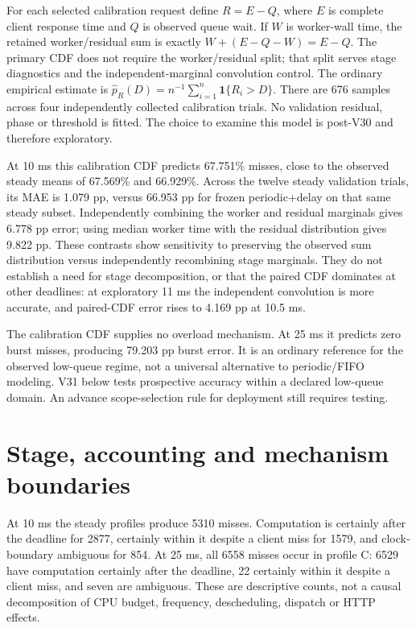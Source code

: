 \documentclass[11pt,a4paper]{article}
\begin{document}
For each selected calibration request define $R=E-Q$, where $E$ is complete
client response time and $Q$ is observed queue wait. If $W$ is worker-wall time,
the retained worker/residual sum is exactly $W+(E-Q-W)=E-Q$. The primary CDF
does not require the worker/residual split; that split serves stage diagnostics
and the independent-marginal convolution control. The ordinary empirical
estimate is $\hat p_R(D)=n^{-1}\sum_{i=1}^{n}\mathbf{1}\{R_i>D\}$.
There are 676 samples across four independently collected calibration trials.
No validation residual, phase or threshold is fitted. The choice to examine
this model is post-V30 and therefore exploratory.

At 10 ms this calibration CDF predicts 67.751\% misses, close to the observed
steady means of 67.569\% and 66.929\%. Across the twelve steady validation trials,
its MAE is 1.079 pp, versus 66.953 pp for frozen periodic+delay on that same
steady subset. Independently combining the worker and residual marginals gives
6.778 pp error; using median worker time with the residual distribution gives
9.822 pp. These contrasts show sensitivity to preserving the observed sum
distribution versus independently recombining stage marginals. They do not
establish a need for stage decomposition, or that the paired
CDF dominates at other deadlines: at exploratory 11 ms the independent
convolution is more accurate, and paired-CDF error rises to 4.169 pp at 10.5 ms.

The calibration CDF supplies no overload mechanism. At 25 ms it predicts zero
burst misses, producing 79.203 pp burst error. It is an ordinary reference for
the observed low-queue regime, not a universal alternative to periodic/FIFO
modeling. V31 below tests prospective accuracy within a declared low-queue
domain. An advance scope-selection rule for deployment still requires testing.

\section{Stage, accounting and mechanism boundaries}

At 10 ms the steady profiles produce 5310 misses. Computation is certainly
after the deadline for 2877, certainly within it despite a client miss for
1579, and clock-boundary ambiguous for 854. At 25 ms, all 6558 misses occur in
profile C: 6529 have computation certainly after the deadline, 22 certainly
within it despite a client miss, and seven are ambiguous. These are
descriptive counts, not a causal decomposition of CPU budget, frequency,
descheduling, dispatch or HTTP effects.
\end{document}
